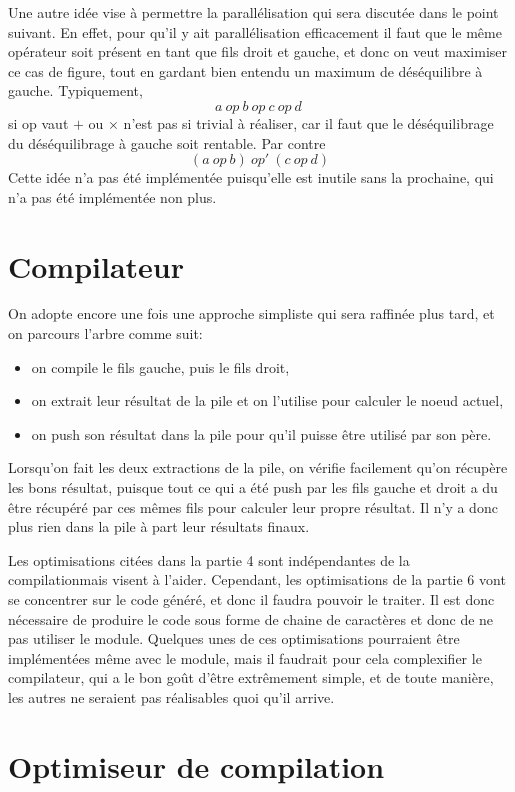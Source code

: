 \documentclass{article}
\begin{document}
Une autre idée vise à permettre la parallélisation qui sera discutée dans le point suivant. En effet, pour qu'il y ait parallélisation efficacement il faut que le même opérateur soit présent en tant que fils droit et gauche, et donc on veut maximiser ce cas de figure, tout en gardant bien entendu un maximum de déséquilibre à gauche. Typiquement, \[ a\ op\ b\ op\ c\ op\ d\ \] si op vaut $+$ ou $\times$ n'est pas si trivial à réaliser, car il faut que le déséquilibrage du déséquilibrage à gauche soit rentable. Par contre \[ (a\ op\ b)\ op'\ (c\ op\ d) \] Cette idée n'a pas été implémentée puisqu'elle est inutile sans la prochaine, qui n'a pas été implémentée non plus.

\section{Compilateur}

On adopte encore une fois une approche simpliste qui sera raffinée plus tard, et on parcours l'arbre comme suit:
\begin{itemize}
\item on compile le fils gauche, puis le fils droit,
\item on extrait leur résultat de la pile et on l'utilise pour calculer le noeud actuel,
\item on push son résultat dans la pile pour qu'il puisse être utilisé par son père.
\end{itemize}
Lorsqu'on fait les deux extractions de la pile, on vérifie facilement qu'on récupère les bons résultat, puisque tout ce qui a été push par les fils gauche et droit a du être récupéré par ces mêmes fils pour calculer leur propre résultat. Il n'y a donc plus rien dans la pile à part leur résultats finaux.

Les optimisations citées dans la partie 4 sont indépendantes de la compilationmais visent à l'aider. Cependant, les optimisations de la partie 6 vont se concentrer sur le code généré, et donc il faudra pouvoir le traiter. Il est donc nécessaire de produire le code sous forme de chaine de caractères et donc de ne pas utiliser le module. Quelques unes de ces optimisations pourraient être implémentées même avec le module, mais il faudrait pour cela complexifier le compilateur, qui a le bon goût d'être extrêmement simple, et de toute manière, les autres ne seraient pas réalisables quoi qu'il arrive.

\section{Optimiseur de compilation}
\end{document}
